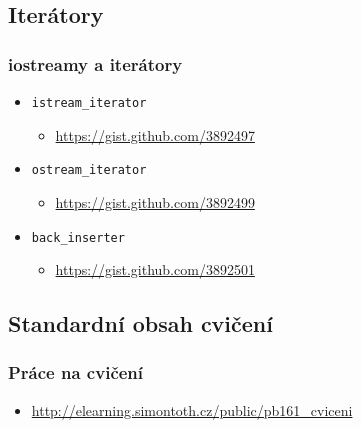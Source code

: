 \subsection{Iterátory}

\begin{frame}
	\frametitle{iostreamy a iterátory}
	\begin{itemize}
		\item{\texttt{istream\_iterator}}
		\begin{itemize}
			\item{\url{https://gist.github.com/3892497}}
		\end{itemize}
		\item{\texttt{ostream\_iterator}}
		\begin{itemize}
			\item{\url{https://gist.github.com/3892499}}
		\end{itemize}
		\item{\texttt{back\_inserter}}
		\begin{itemize}
			\item{\url{https://gist.github.com/3892501}}
		\end{itemize}
	\end{itemize}
\end{frame}

\subsection{Standardní obsah cvičení}

\begin{frame}
	\frametitle{Práce na cvičení}
	\begin{itemize}
		\item{\href{http://elearning.simontoth.cz/public/pb161\_cviceni}{http://elearning.simontoth.cz/public/pb161\_cviceni}}
	\end{itemize}
\end{frame}




